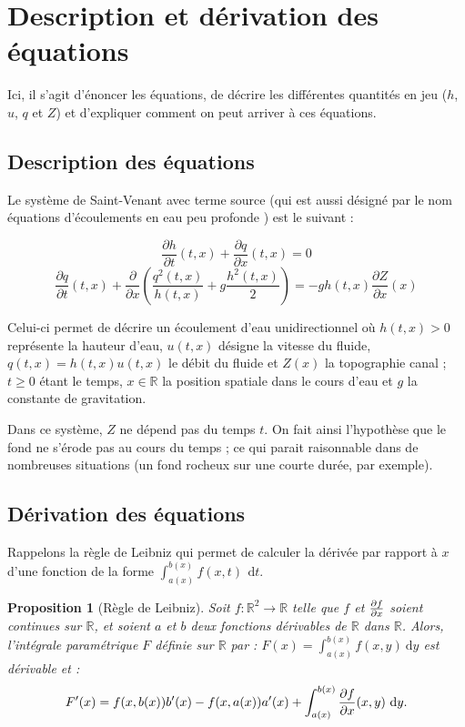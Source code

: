 \documentclass[
11pt, %
francais, %
singlespacing, %
headsepline, %
]{MastersDoctoralThesis} %
\newtheorem{prop}{Proposition}
\begin{document}
\newpage

\section{Description et dérivation des équations}

Ici, il s'agit  d'énoncer les équations, de décrire les différentes quantités en jeu ($h$, $u$, $q$ et $Z$)
et d'expliquer comment on peut arriver à ces équations.

\subsection{Description des équations}

Le système de Saint-Venant avec terme source (qui est aussi désigné par le nom \og équations d'écoulements en eau peu profonde  \fg{}) est le suivant :

\begin{equation} \frac{\partial h}{\partial t}(t,x)+\frac{\partial q}{\partial x}(t,x)=0 \label{sveq1} \end{equation}
\begin{equation} \frac{\partial q}{\partial t}(t,x)+\frac{\partial}{\partial x}(\frac{q^{2}(t,x)}{h(t,x)}+g\frac{h^{2}(t,x)}{2})=-gh(t,x)\frac{\partial Z}{\partial x}(x) \label{sveq2} \end{equation}

Celui-ci permet de décrire un écoulement d'eau unidirectionnel où $h(t,x)>0$ représente la hauteur d'eau, $u(t,x)$ désigne la vitesse du fluide, $q(t,x)=h(t,x)u(t,x)$ le débit du fluide et $Z(x)$ la topographie canal ; $t\geq0$ étant le temps, $x\in\mathbb{R}$ la position spatiale dans le cours d'eau et $g$ la constante de gravitation.

Dans ce système, $Z$ ne dépend pas du temps $t$. On
fait ainsi l'hypothèse que le fond ne s'érode pas au cours du temps ; ce qui parait raisonnable dans de nombreuses situations (un fond rocheux sur une courte durée, par exemple).

\subsection{Dérivation des équations}

Rappelons la règle de Leibniz qui permet de calculer la dérivée par rapport à $x$ d'une fonction de la forme $\int_{a(x)}^{b(x)} f(x,t)\,~\mathrm dt$.

\begin{prop}[Règle de Leibniz]
Soit $f : \mathbb{R}^{2} \rightarrow\mathbb{R}$ telle que $f$ et ${\partial f\over\partial x}$ soient continues sur $\mathbb{R}$, et soient $a$ et $b$ deux fonctions dérivables de $\mathbb{R}$ dans $\mathbb{R}$. Alors, l'intégrale paramétrique $F$ définie sur $\mathbb{R}$ par : $F(x)=\int_{a(x)}^{b(x)}f(x,y)~\mathrm dy$ est dérivable et :
\begin{equation}
F'(x)=f(x, b(x))b'(x)-f(x,a(x))a'(x)+\int_{a(x)}^{b(x)}{\partial f\over \partial x}(x,y)~\mathrm dy.
\end{equation}
\end{prop}
\end{document}
